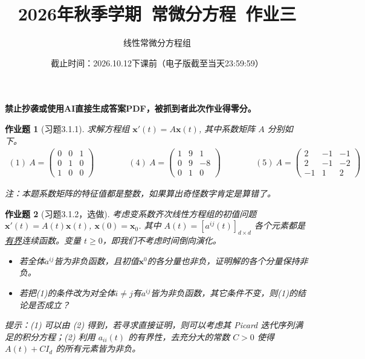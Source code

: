 \documentclass[UTF8,fontset=windows,12pt]{ctexart}
\theoremstyle{kaiti-theorem}
\newtheorem{problem}{作业题}
\numberwithin{equation}{section}
\newcommand{\R}{\mathbb{R}}
\newcommand{\bds}[1]{\boldsymbol{#1}}  %
\newcommand{\xx}{{\bds{x}}}
\newcommand{\ff}{\bds{f}}
\begin{document}
\title{\LARGE{\bf  2026年秋季学期~常微分方程~作业三}}
\author{线性常微分方程组}
\date{截止时间：2026.10.12下课前（电子版截至当天23:59:59）}

\maketitle

\textbf{禁止抄袭或使用AI直接生成答案PDF，被抓到者此次作业得零分。}


\begin{problem}[习题3.1.1]
求解方程组 $\xx'(t)=A\xx(t)$, 其中系数矩阵 $A$ 分别如下。
\begin{align*}
(1)~A=\begin{pmatrix} 0&0&1\\0&1&0\\1&0&0 \end{pmatrix}\qquad\qquad (4)~A=\begin{pmatrix}1&9&1\\0&9&-8\\0&1&0 \end{pmatrix}\qquad\qquad (5)~A=\begin{pmatrix} 2&-1&-1\\2&-1&-2\\-1&1&2 \end{pmatrix}
\end{align*}

注：本题系数矩阵的特征值都是整数，如果算出奇怪数字肯定是算错了。
\end{problem}

\begin{problem}[习题3.1.2，选做]
考虑变系数齐次线性方程组的初值问题 $\xx'(t)=A(t)\xx(t)$, $\xx(0)=\xx_0$. 其中 $A(t)=[a^{ij}(t)]_{d\times d}$ 各个元素都是\underline{有界}连续函数。变量 $t\geqslant 0$，即我们不考虑时间倒向演化。
\begin{itemize}
\item [(1)] 若全体$a^{ij}$皆为非负函数，且初值$\xx^0$的各分量也非负，证明解的各个分量保持非负。
\item [(2)] 若把(1)的条件改为对全体$i\neq j$有$a^{ij}$皆为非负函数，其它条件不变，则(1)的结论是否成立？
\end{itemize}

提示：(1) 可以由 (2) 得到，若寻求直接证明，则可以考虑其 Picard 迭代序列满足的积分方程；(2) 利用 $a_{ii}(t)$ 的有界性，去充分大的常数 $C>0$ 使得 $A(t)+CI_d$ 的所有元素皆为非负。
\end{problem}
\end{document}
